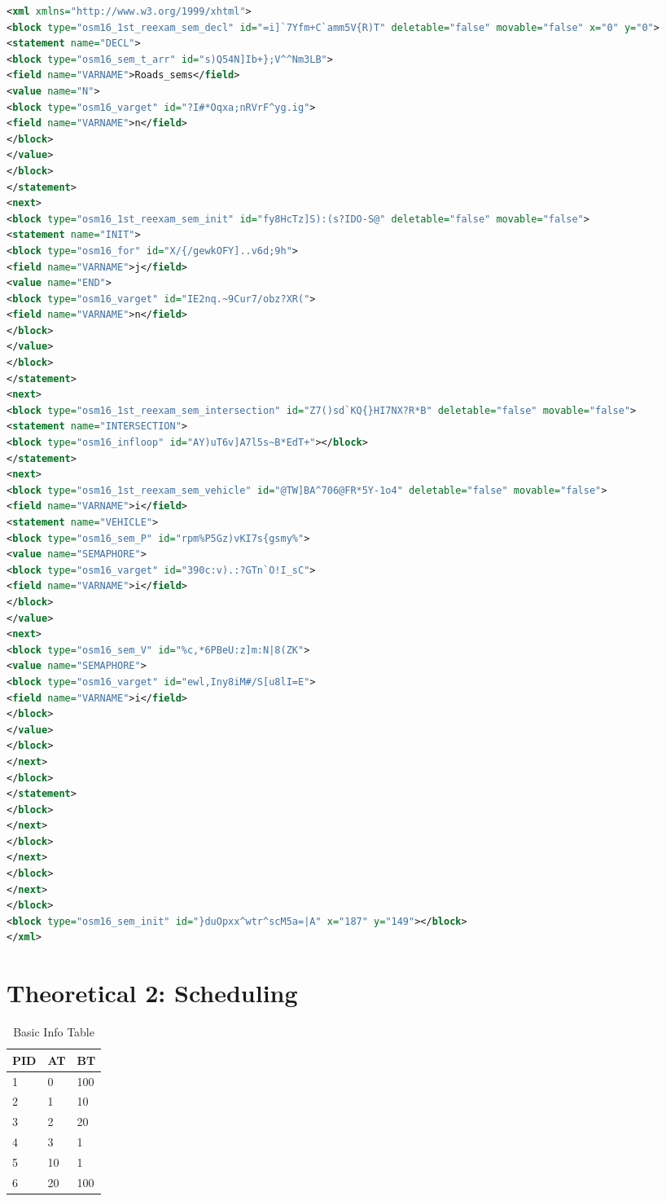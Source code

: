 \documentclass[11pt,a4paper]{article}
\theoremstyle{plain}
\theoremstyle{definition}
\theoremstyle{remark}
\numberwithin{equation}{section}
\begin{document}
\begin{lstlisting}[language=XML,caption={Example Code},label={lst:ex_code1}]
<xml xmlns="http://www.w3.org/1999/xhtml">
<block type="osm16_1st_reexam_sem_decl" id="=i]`7Yfm+C`amm5V{R)T" deletable="false" movable="false" x="0" y="0">
<statement name="DECL">
<block type="osm16_sem_t_arr" id="s)Q54N]Ib+};V^^Nm3LB">
<field name="VARNAME">Roads_sems</field>
<value name="N">
<block type="osm16_varget" id="?I#*Oqxa;nRVrF^yg.ig">
<field name="VARNAME">n</field>
</block>
</value>
</block>
</statement>
<next>
<block type="osm16_1st_reexam_sem_init" id="fy8HcTz]S):(s?IDO-S@" deletable="false" movable="false">
<statement name="INIT">
<block type="osm16_for" id="X/{/gewkOFY]..v6d;9h">
<field name="VARNAME">j</field>
<value name="END">
<block type="osm16_varget" id="IE2nq.~9Cur7/obz?XR(">
<field name="VARNAME">n</field>
</block>
</value>
</block>
</statement>
<next>
<block type="osm16_1st_reexam_sem_intersection" id="Z7()sd`KQ{}HI7NX?R*B" deletable="false" movable="false">
<statement name="INTERSECTION">
<block type="osm16_infloop" id="AY)uT6v]A7l5s~B*EdT+"></block>
</statement>
<next>
<block type="osm16_1st_reexam_sem_vehicle" id="@TW]BA^706@FR*5Y-1o4" deletable="false" movable="false">
<field name="VARNAME">i</field>
<statement name="VEHICLE">
<block type="osm16_sem_P" id="rpm%P5Gz)vKI7s{gsmy%">
<value name="SEMAPHORE">
<block type="osm16_varget" id="390c:v).:?GTn`O!I_sC">
<field name="VARNAME">i</field>
</block>
</value>
<next>
<block type="osm16_sem_V" id="%c,*6PBeU:z]m:N|8(ZK">
<value name="SEMAPHORE">
<block type="osm16_varget" id="ewl,Iny8iM#/S[u8lI=E">
<field name="VARNAME">i</field>
</block>
</value>
</block>
</next>
</block>
</statement>
</block>
</next>
</block>
</next>
</block>
</next>
</block>
<block type="osm16_sem_init" id="}duOpxx^wtr^scM5a=|A" x="187" y="149"></block>
</xml>
\end{lstlisting}

\section*{Theoretical 2: Scheduling}

\begin{table}[H]
	\centering
	\caption{Basic Info Table}
	\label{sch-basic}
	\begin{tabular}{lll}
		\hline
		\multicolumn{1}{|l|}{PID} & \multicolumn{1}{l|}{AT} & \multicolumn{1}{l|}{BT} \\ \hline
		1                         & 0                       & 100                     \\
		2                         & 1                       & 10                      \\
		3                         & 2                       & 20                      \\
		4                         & 3                       & 1                       \\
		5                         & 10                      & 1                       \\
		6                         & 20                      & 100                    
	\end{tabular}
\end{table}
\end{document}
